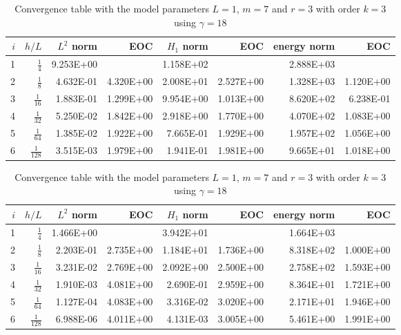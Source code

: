 \begin{table}
  \caption{\label{tab:ex1_order:a} Convergence table with the model parameters $L=1$, $m=7$ and $r=3$ with order $k=2$ using $ \gamma = 9$.}
  \begin{tabular}{rrrrrrrr}
    \hline\hline
    $i$&\textbf{$h/{L} $} & \textbf{$L^2$ norm} & \textbf{EOC} & \textbf{$H_1$ norm} & \textbf{EOC} & \textbf{energy norm} & \textbf{EOC} \\\hline
    1&$\frac{1}{4}$ & 9.253E+00 &  & 1.158E+02 &  & 2.888E+03 &  \\
    2&$\frac{1}{8}$ & 4.632E-01 & 4.320E+00 & 2.008E+01 & 2.527E+00 & 1.328E+03 & 1.120E+00 \\
    3&$\frac{1}{16}$ & 1.883E-01 & 1.299E+00 & 9.954E+00 & 1.013E+00 & 8.620E+02 & 6.238E-01 \\
    4&$\frac{1}{32}$ & 5.250E-02 & 1.842E+00 & 2.918E+00 & 1.770E+00 & 4.070E+02 & 1.083E+00 \\
    5&$\frac{1}{64}$ & 1.385E-02 & 1.922E+00 & 7.665E-01 & 1.929E+00 & 1.957E+02 & 1.056E+00 \\
    6&$\frac{1}{128}$ & 3.515E-03 & 1.979E+00 & 1.941E-01 & 1.981E+00 & 9.665E+01 & 1.018E+00 \\\hline\hline
  \end{tabular}
  \caption{\label{tab:ex1_order:b} Convergence table with the model parameters $L=1$, $m=7$ and $r=3$ with order $k=3$ using $ \gamma = 18$ }
  \begin{tabular}{rrrrrrrr}
    \hline\hline
    $i$&\textbf{$h/{L} $} & \textbf{$L^2$ norm} & \textbf{EOC} & \textbf{$H_1$ norm} & \textbf{EOC} & \textbf{energy norm} & \textbf{EOC} \\\hline
    1&$\frac{1}{4}$ & 1.466E+00 &  & 3.942E+01 &  & 1.664E+03 &  \\
    2&$\frac{1}{8}$ & 2.203E-01 & 2.735E+00 & 1.184E+01 & 1.736E+00 & 8.318E+02 & 1.000E+00 \\
    3&$\frac{1}{16}$ & 3.231E-02 & 2.769E+00 & 2.092E+00 & 2.500E+00 & 2.758E+02 & 1.593E+00 \\
    4&$\frac{1}{32}$ & 1.910E-03 & 4.081E+00 & 2.690E-01 & 2.959E+00 & 8.364E+01 & 1.721E+00 \\
    5&$\frac{1}{64}$ & 1.127E-04 & 4.083E+00 & 3.316E-02 & 3.020E+00 & 2.171E+01 & 1.946E+00 \\
    6&$\frac{1}{128}$ & 6.988E-06 & 4.011E+00 & 4.131E-03 & 3.005E+00 & 5.461E+00 & 1.991E+00 \\\hline\hline
  \end{tabular}


\end{table}
